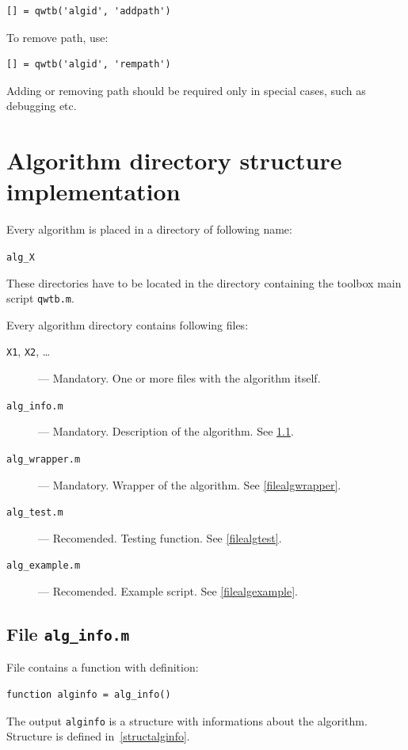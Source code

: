 \documentclass[12pt]{article} %
\begin{document}
\begin{lstlisting}
[] = qwtb('algid', 'addpath')
\end{lstlisting}

To remove path, use:

\begin{lstlisting}
[] = qwtb('algid', 'rempath')
\end{lstlisting}

Adding or removing path should be required only in special cases, such as debugging etc.

\section{Algorithm directory structure implementation} %
Every algorithm is placed in a directory of following name:
\begin{center}
        {\tt alg\_X}
\end{center}
These directories have to be located in the directory containing the toolbox main script {\tt qwtb.m}.

Every algorithm directory contains following files:
\begin{description}
        \item [{\tt X1}, {\tt X2}, \dots] ---  Mandatory. One or more files with the algorithm itself.
        \item [{\tt alg\_info.m}] ---  Mandatory. Description of the algorithm. See \ref{filealginfo}.
        \item [{\tt alg\_wrapper.m}] ---  Mandatory. Wrapper of the algorithm. See \ref{filealgwrapper}.
        \item [{\tt alg\_test.m}] ---  Recomended. Testing function. See \ref{filealgtest}.
        \item [{\tt alg\_example.m}] ---  Recomended. Example script. See \ref{filealgexample}.
\end{description}

\subsection{File {\tt alg\_info.m}} %
\label{filealginfo}
File contains a function with definition:

\begin{lstlisting}
function alginfo = alg_info()
\end{lstlisting}

The output \lstinline{alginfo} is a structure with informations about the algorithm. Structure is
defined in~\ref{structalginfo}.
\end{document}
